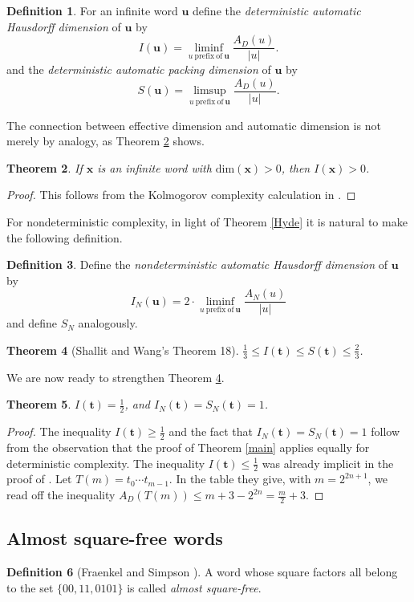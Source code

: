 \documentclass[12pt]{article}
\newcommand{\squarefree}{square-free}
\newcommand{\abs}[1]{\lvert#1\rvert}
\theoremstyle{plain}
\newtheorem{thm}{Theorem}
\theoremstyle{definition}
\newtheorem{df}[thm]{Definition}
\theoremstyle{remark}
\begin{document}
			\begin{df}\label{daHd}
				For an infinite word $\mathbf u$ define the \emph{deterministic automatic Hausdorff dimension} of $\mathbf u$ by
				\[
					I(\mathbf u)=\liminf_{u\mathrm{\ prefix\ of\ }\mathbf u} \frac{A_D(u)}{\abs{u}}.
				\]
				and the \emph{deterministic automatic packing dimension} of $\mathbf u$ by
				\[
					S(\mathbf u)=\limsup_{u\mathrm{\ prefix\ of\ }\mathbf u} \frac{A_D(u)}{\abs{u}}.
				\]
			\end{df}
			The connection between effective dimension and automatic dimension is not merely by analogy, as Theorem \ref{christmas2014} shows.
			\begin{thm}\label{christmas2014}
				If $\mathbf x$ is an infinite word with $\mathrm{dim}(\mathbf x)>0$, then $I(\mathbf x)>0$.
			\end{thm}
			\begin{proof}
				This follows from the Kolmogorov complexity calculation in \cite[Theorem 9]{MR1897300}.
			\end{proof}
			For nondeterministic complexity, in light of Theorem \ref{Hyde} it is natural to make the following definition.
			\begin{df}\label{naHd}
				Define the \emph{nondeterministic automatic Hausdorff dimension} of $\mathbf u$ by
				\[
					I_N(\mathbf u)=2\cdot\liminf_{u\mathrm{\ prefix\ of\ }\mathbf u} \frac{A_N(u)}{\abs{u}}
				\]
				and define $S_N$ analogously.
			\end{df}
			\begin{thm}[Shallit and Wang's Theorem 18]\label{toStrengthen}
				$\frac13\le I(\mathbf t)\le S(\mathbf t)\le\frac23$.
			\end{thm}
			We are now ready to strengthen Theorem \ref{toStrengthen}.
			\begin{thm}
				$I(\mathbf{t})= \frac12$, and $I_N(\mathbf t)=S_N(\mathbf t)=1$.
			\end{thm}
			\begin{proof}
				The inequality $I(\mathbf t)\ge \frac12$ and the fact that $I_N(\mathbf t)=S_N(\mathbf t)=1$ follow from the observation that
				the proof of Theorem \ref{main} applies equally for deterministic complexity.
				The inequality $I(\mathbf t)\le \frac12$ was already implicit in the proof of \cite[Theorem 18]{MR1897300}.
				Let $T(m)=t_0 \cdots t_{m-1}$.
				In the table they give, with $m=2^{2n+1}$, we read off the inequality $A_D(T(m)) \le m + 3 - 2^{2n} = \frac{m}2 +3$.
			\end{proof}
		\subsection{Almost {\squarefree} words}
			\begin{df}[Fraenkel and Simpson \cite{MR1309124}]
				A word whose square factors all belong to the set $\{00, 11, 0101\}$ is called \emph{almost {\squarefree}}.
			\end{df}
\end{document}
